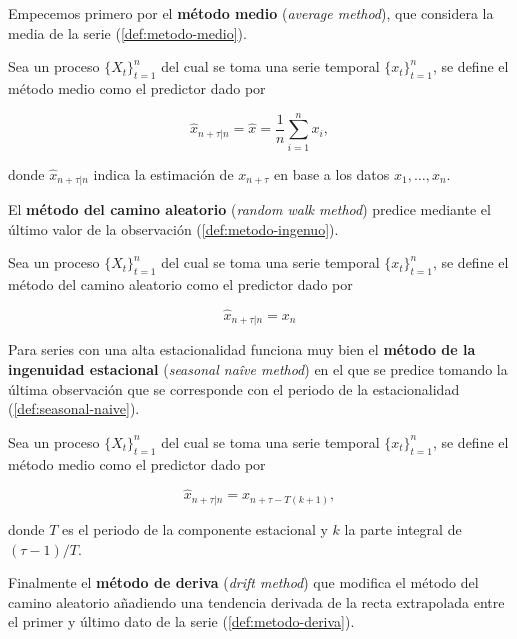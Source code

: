Empecemos primero por el \textbf{método medio} (\emph{average method}), que considera la media de la serie (\autoref{def:metodo-medio}).

\begin{definicion}
  Sea un proceso $\{X_t\}_{t = 1}^n$ del cual se toma una serie temporal $\{x_t\}_{t = 1}^n$, se define el método medio como el predictor dado por

  $$\hat{x}_{n + \tau | n} = \hat{x} = \dfrac{1}{n}\sum \limits^n_{i = 1} x_i, $$

  donde $\hat{x}_{n + \tau | n}$ indica la estimación de $x_{n + \tau}$ en base a los datos $x_1, \ldots, x_n$.
  \label{def:metodo-medio}
\end{definicion}

El \textbf{método del camino aleatorio} (\emph{random walk method}) predice mediante el último valor de la observación (\autoref{def:metodo-ingenuo}).

\begin{definicion}
  Sea un proceso $\{X_t\}_{t = 1}^n$ del cual se toma una serie temporal $\{x_t\}_{t = 1}^n$, se define el método del camino aleatorio como el predictor dado por

  $$\hat{x}_{n + \tau | n} = x_n$$
  \label{def:metodo-ingenuo}
\end{definicion}

Para series con una alta estacionalidad funciona muy bien el \textbf{método de la ingenuidad estacional} (\emph{seasonal naîve method}) en el que se predice tomando la última observación que se corresponde con el periodo de la estacionalidad (\autoref{def:seasonal-naive}).

\begin{definicion}
  Sea un proceso $\{X_t\}_{t = 1}^n$ del cual se toma una serie temporal $\{x_t\}_{t = 1}^n$, se define el método medio como el predictor dado por

  $$\hat{x}_{n + \tau | n} = x_{n + \tau - T(k + 1)},$$

  donde $T$ es el periodo de la componente estacional y $k$ la parte integral de $(\tau - 1)/T$.
  \label{def:seasonal-naive}
\end{definicion}

Finalmente el \textbf{método de deriva} (\emph{drift method}) que modifica el método del camino aleatorio añadiendo una tendencia derivada de la recta extrapolada entre el primer y último dato de la serie (\autoref{def:metodo-deriva}).

